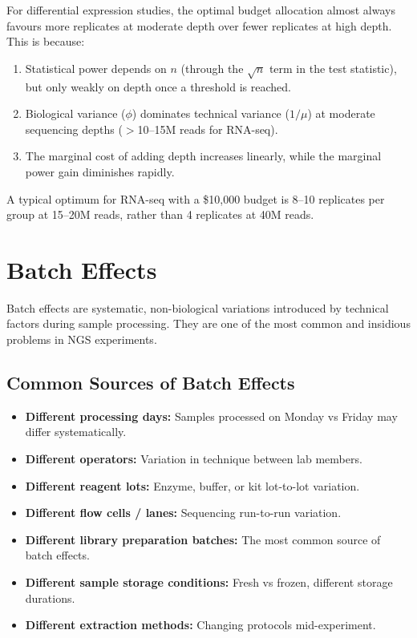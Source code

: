 \begin{keyconcept}[title={The Cost-Optimisation Principle}]
For differential expression studies, the optimal budget allocation almost always favours more replicates at moderate depth over fewer replicates at high depth. This is because:
\begin{enumerate}[nosep]
  \item Statistical power depends on $n$ (through the $\sqrt{n}$ term in the test statistic), but only weakly on depth once a threshold is reached.
  \item Biological variance ($\phi$) dominates technical variance ($1/\mu$) at moderate sequencing depths ($>$10--15M reads for RNA-seq).
  \item The marginal cost of adding depth increases linearly, while the marginal power gain diminishes rapidly.
\end{enumerate}
A typical optimum for RNA-seq with a \$10,000 budget is 8--10 replicates per group at 15--20M reads, rather than 4 replicates at 40M reads.
\end{keyconcept}

\section{Batch Effects}
\label{sec:expdesign:batch}

Batch effects are systematic, non-biological variations introduced by technical factors during sample processing. They are one of the most common and insidious problems in NGS experiments.

\subsection{Common Sources of Batch Effects}

\begin{itemize}[itemsep=2pt]
  \item \textbf{Different processing days:} Samples processed on Monday vs Friday may differ systematically.
  \item \textbf{Different operators:} Variation in technique between lab members.
  \item \textbf{Different reagent lots:} Enzyme, buffer, or kit lot-to-lot variation.
  \item \textbf{Different flow cells / lanes:} Sequencing run-to-run variation.
  \item \textbf{Different library preparation batches:} The most common source of batch effects.
  \item \textbf{Different sample storage conditions:} Fresh vs frozen, different storage durations.
  \item \textbf{Different extraction methods:} Changing protocols mid-experiment.
\end{itemize}

